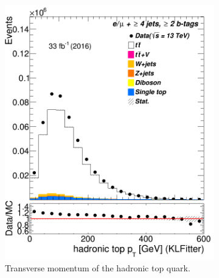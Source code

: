 \begin{figure}
\begin{subfigure}{0.25\textwidth}
	\includegraphics[width=\linewidth]{ControlPlots_emujets_2016_4incl_2incl/klf_topHad_pt_emujets_2016.png}
	\caption{Transverse momentum of the hadronic top quark.} \label{fig:K10}
\end{subfigure}\hspace*{0.5cm}
\begin{subfigure}{0.25\textwidth}

\end{subfigure}
\end{figure}
